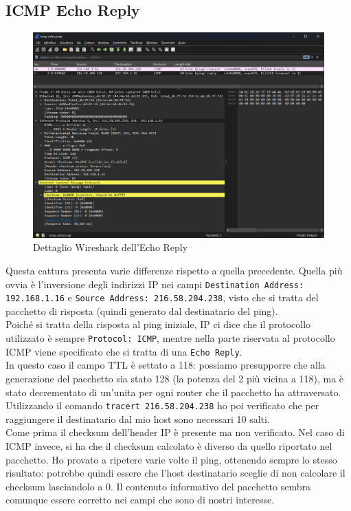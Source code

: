 \documentclass[12pt,a4paper]{report}
\begin{document}
\subsection{ICMP Echo Reply}
\begin{figure}[H]
	\centering
	\includegraphics[width=1\textwidth]{icmp_echo_reply}
 	\caption{Dettaglio Wireshark dell'Echo Reply}
\end{figure}
Questa cattura presenta varie differenze rispetto a quella precedente. 
Quella più ovvia è l'inversione degli indirizzi IP nei campi \texttt{Destination Address: 192.168.1.16} e  \texttt{Source Address: 216.58.204.238}, visto che si tratta del pacchetto di risposta (quindi generato dal destinatario del ping).\\
Poiché si tratta della risposta al ping iniziale, IP ci dice che il protocollo utilizzato è sempre \texttt{Protocol: ICMP}, mentre nella parte riservata al protocollo ICMP viene specificato che si tratta di una \texttt{Echo Reply}.\\
In questo caso il campo {TTL} è settato a 118: possiamo presupporre che alla generazione del pacchetto sia stato 128 (la potenza del 2 più vicina a 118), ma è stato decrementato di un'unita per ogni router che il pacchetto ha attraversato.
Utilizzando il comando \texttt{tracert 216.58.204.238} ho poi verificato che per raggiungere il destinatario dal mio host sono necessari 10 salti. \\
Come prima il checksum dell'header IP è presente ma non verificato. Nel caso di ICMP invece, si ha che il checksum calcolato è diverso da quello riportato nel pacchetto. Ho provato a ripetere varie volte il ping, ottenendo sempre lo stesso risultato: potrebbe quindi essere che l'host destinatario sceglie di non calcolare il checksum lasciandolo a 0. Il contenuto informativo del pacchetto sembra comunque essere corretto nei campi che sono di nostri interesse.
\end{document}
